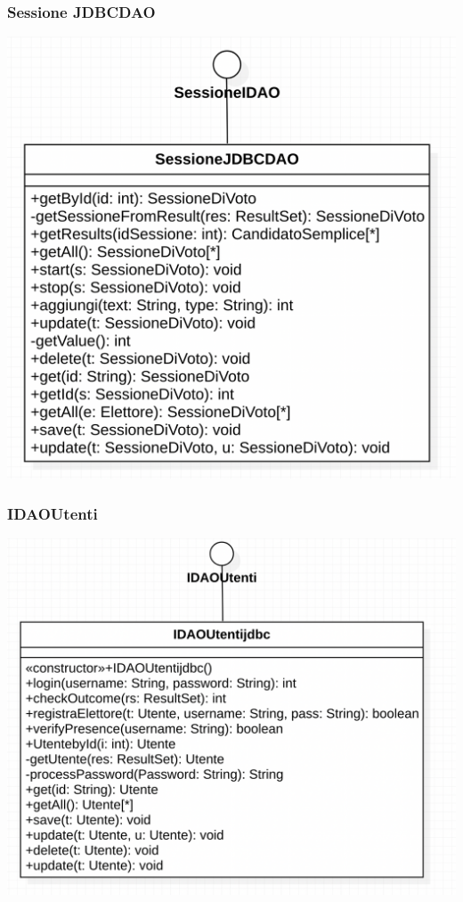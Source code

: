 \documentclass[11pt, oneside]{article}   	%
\begin{document}
\subsubsection{Sessione JDBCDAO}
\begin{center}
\includegraphics[scale=0.7]{images/class6.png}
\end{center}

\subsubsection{IDAOUtenti}
\begin{center}
\includegraphics[scale=0.6]{images/class7.png}
\end{center}
\end{document}
